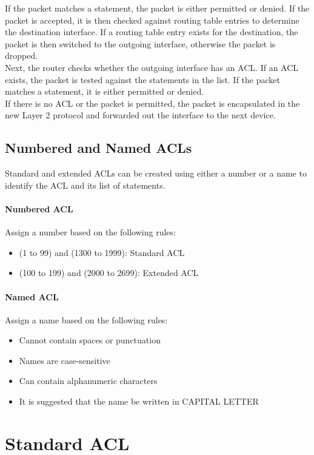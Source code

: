If the packet matches a statement, the packet is either permitted or denied. If the packet is accepted, it is then checked against routing table entries to determine the destination interface. If a routing table entry exists for the destination, the packet is then switched to the outgoing interface, otherwise the packet is dropped. \\

Next, the router checks whether the outgoing interface has an ACL. If an ACL exists, the packet is tested against the statements in the list. If the packet matches a statement, it is either permitted or denied. \\

If there is no ACL or the packet is permitted, the packet is encapsulated in the new Layer 2 protocol and forwarded out the interface to the next device.

\subsection{Numbered and Named ACLs}

Standard and extended ACLs can be created using either a number or a name to identify the ACL and its list of statements.

\paragraph{Numbered ACL} Assign a number based on the following rules:
\begin{itemize}
\item (1 to 99) and (1300 to 1999): Standard ACL
\item (100 to 199) and (2000 to 2699): Extended ACL
\end{itemize}

\paragraph{Named ACL} Assign a name based on the following rules:
\begin{itemize}
\item Cannot contain spaces or punctuation
\item Names are case-sensitive
\item Can contain alphanumeric characters
\item It is suggested that the name be written in CAPITAL LETTER
\end{itemize}
	
\section{Standard ACL}

